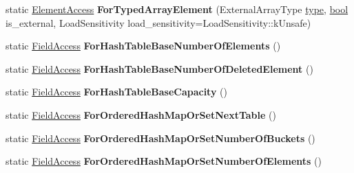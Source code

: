 \begin{DoxyCompactItemize}
static \mbox{\hyperlink{structv8_1_1internal_1_1compiler_1_1ElementAccess}{Element\+Access}} {\bfseries For\+Typed\+Array\+Element} (External\+Array\+Type \mbox{\hyperlink{classstd_1_1conditional_1_1type}{type}}, \mbox{\hyperlink{classbool}{bool}} is\+\_\+external, Load\+Sensitivity load\+\_\+sensitivity=Load\+Sensitivity\+::k\+Unsafe)
\item 
\mbox{\label{classv8_1_1internal_1_1compiler_1_1AccessBuilder_a397be99fb5ec1ed57567b68621d16a93}} 
static \mbox{\hyperlink{structv8_1_1internal_1_1compiler_1_1FieldAccess}{Field\+Access}} {\bfseries For\+Hash\+Table\+Base\+Number\+Of\+Elements} ()
\item 
\mbox{\label{classv8_1_1internal_1_1compiler_1_1AccessBuilder_a95df40ae4dcefa8e88ec9c71360e3e29}} 
static \mbox{\hyperlink{structv8_1_1internal_1_1compiler_1_1FieldAccess}{Field\+Access}} {\bfseries For\+Hash\+Table\+Base\+Number\+Of\+Deleted\+Element} ()
\item 
\mbox{\label{classv8_1_1internal_1_1compiler_1_1AccessBuilder_a62547af90687a5a5e39be6f71524d887}} 
static \mbox{\hyperlink{structv8_1_1internal_1_1compiler_1_1FieldAccess}{Field\+Access}} {\bfseries For\+Hash\+Table\+Base\+Capacity} ()
\item 
\mbox{\label{classv8_1_1internal_1_1compiler_1_1AccessBuilder_a454d6e6381c225815038dbbdca628b8f}} 
static \mbox{\hyperlink{structv8_1_1internal_1_1compiler_1_1FieldAccess}{Field\+Access}} {\bfseries For\+Ordered\+Hash\+Map\+Or\+Set\+Next\+Table} ()
\item 
\mbox{\label{classv8_1_1internal_1_1compiler_1_1AccessBuilder_a7b772d5fe38ea7a99f9474df1bdf6342}} 
static \mbox{\hyperlink{structv8_1_1internal_1_1compiler_1_1FieldAccess}{Field\+Access}} {\bfseries For\+Ordered\+Hash\+Map\+Or\+Set\+Number\+Of\+Buckets} ()
\item 
\mbox{\label{classv8_1_1internal_1_1compiler_1_1AccessBuilder_afac29677102b12ad3e4230f2d5188eee}} 
static \mbox{\hyperlink{structv8_1_1internal_1_1compiler_1_1FieldAccess}{Field\+Access}} {\bfseries For\+Ordered\+Hash\+Map\+Or\+Set\+Number\+Of\+Elements} ()

\end{DoxyCompactItemize}
